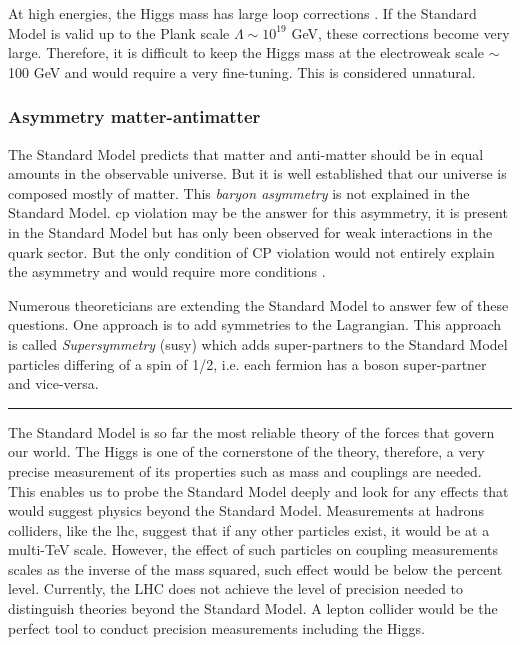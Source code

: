 At high energies, the Higgs mass has large loop corrections \cite{Vieira:2012ex}. If the Standard Model is valid up to the Plank scale $\Lambda \sim 10^19$ GeV, these corrections become very large. Therefore, it is difficult to keep the Higgs mass at the electroweak scale $\sim$100 GeV and would require a very fine-tuning. This is considered unnatural.

\subsubsection*{Asymmetry matter-antimatter}

The Standard Model predicts that matter and anti-matter should be in equal amounts in the observable universe. But it is well established that our universe is composed mostly of matter. This \textit{baryon asymmetry} is not explained in the Standard Model. \acrshort{cp} violation \cite{Ellis:1978hq} may be the answer for this asymmetry, it is present in the Standard Model but has only been observed for weak interactions in the quark sector. But the only condition of CP violation would not entirely explain the asymmetry and would require more conditions \cite{Sakharov:1967dj}.

Numerous theoreticians are extending the Standard Model to answer few of these questions. One approach is to add symmetries to the Lagrangian. This approach is called \textit{Supersymmetry} (\acrshort{susy}) which adds super-partners to the Standard Model particles differing of a spin of 1/2, i.e. each fermion has a boson super-partner and vice-versa.

\begin{center}
  \rule{0.5\textwidth}{.4pt}
\end{center}

The Standard Model is so far the most reliable theory of the forces that govern our world. The Higgs is one of the cornerstone of the theory, therefore, a very precise measurement of its properties such as mass and couplings are needed. This enables us to probe the Standard Model deeply and look for any effects that would suggest physics beyond the Standard Model. Measurements at hadrons colliders, like the \acrlong{lhc}, suggest that if any other particles exist, it would be at a multi-TeV scale. However, the effect of such particles on coupling measurements scales as the inverse of the mass squared, such effect would be below the percent level. Currently, the LHC does not achieve the level of precision needed to distinguish theories beyond the Standard Model. A lepton collider would be the perfect tool to conduct precision measurements including the Higgs.
